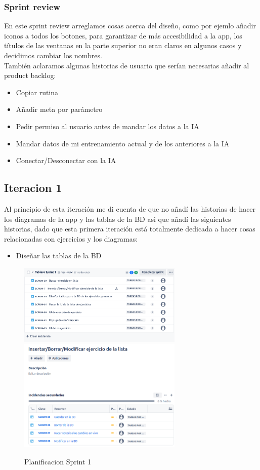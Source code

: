 \subsubsection{Sprint review}
En este sprint review arreglamos cosas acerca del diseño, como por ejemlo añadir iconos a todos los botones, para garantizar de más accesibilidad a la app, los títulos de las ventanas en la parte superior no eran claros en algunos casos y decidimos cambiar los nombres.\\

También aclaramos algunas historias de usuario que serían necesarias añadir al product backlog:
\begin{itemize}
	\item Copiar rutina
	\item Añadir meta por parámetro
	\item Pedir permiso al usuario antes de mandar los datos a la IA
	\item Mandar datos de mi entrenamiento actual y de los anteriores a la IA
	\item Conectar/Desconectar con la IA
\end{itemize}

\subsection{Iteracion 1}
Al principio de esta iteración me di cuenta de que no añadí las historias de hacer los diagramas de la app y las tablas de la BD asi que añadí las siguientes historias, dado que esta primera iteración está totalmente dedicada a hacer cosas relacionadas con ejercicios y los diagramas:
\begin{itemize}
	\item Diseñar las tablas de la BD
\end{itemize}

\begin{figure}[h!]
  \centering
  \includegraphics[width=0.7\textwidth]{fotos/PreSrprint1.png}
  \includegraphics[width=0.7\textwidth]{fotos/SubListPre1.png}
  \caption{Planificacion Sprint 1}
  \label{fig:imagen}
\end{figure}

